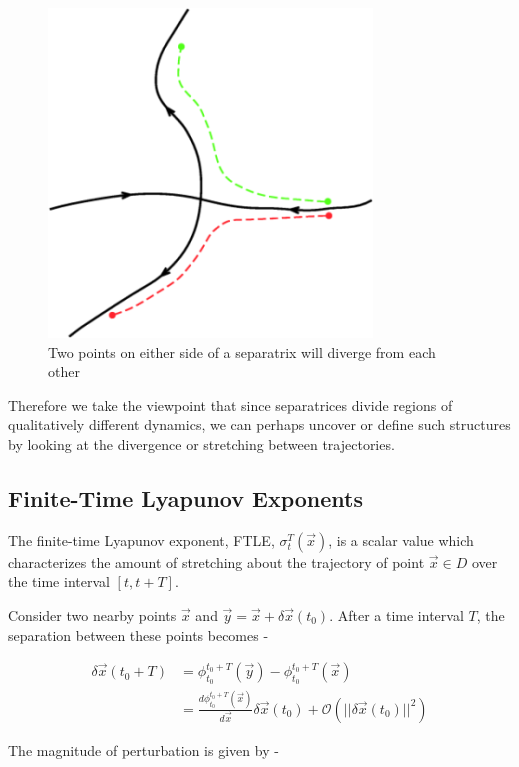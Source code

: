 \begin{figure}
    \centering
    \includegraphics{figures/hyperbolic_point.png}
    \caption{Two points on either side of a separatrix will diverge from each other}
    \label{fig:hyperbolic}
\end{figure}

Therefore we take the viewpoint that since separatrices divide regions of qualitatively different dynamics, we can perhaps uncover or define such structures by looking at the divergence or stretching between trajectories. \cite{LCSTut}

\subsection{Finite-Time Lyapunov Exponents}

The finite-time Lyapunov exponent, FTLE, $\sigma_t^T(\vec{x})$, is a scalar value which characterizes the amount of stretching about the trajectory of point $\vec{x} \in D$ over the time interval $\left[t, t + T\right]$.

Consider two nearby points $\vec{x}$ and $\vec{y} = \vec{x} + \delta \vec{x}(t_0)$. After a time interval $T$, the separation between these points becomes -

\begin{align*}
    \delta \vec{x}(t_0 + T) & = \phi^{t_0 + T}_{t_0}(\vec{y}) - \phi^{t_0 + T}_{t_0}(\vec{x}) \\
    & = \frac{d\phi^{t_0 + T}_{t_0}(\vec{x})}{d\vec{x}}\delta \vec{x}(t_0) + \mathcal{O}(||\delta\vec{x}(t_0)||^2)
\end{align*}

The magnitude of perturbation is given by -

